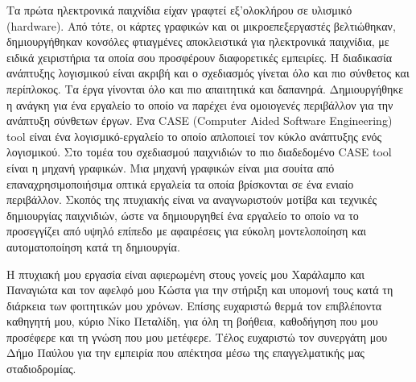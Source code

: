 	\begin{Abstract}
		Τα πρώτα ηλεκτρονικά παιχνίδια είχαν γραφτεί εξ'ολοκλήρου σε υλισμικό (hardware). Από τότε, οι κάρτες γραφικών και οι μικροεπεξεργαστές βελτιώθηκαν, δημιουργήθηκαν κονσόλες φτιαγμένες αποκλειστικά για ηλεκτρονικά παιχνίδια, με ειδικά χειριστήρια τα οποία σου προσφέρουν διαφορετικές εμπειρίες.
		Η διαδικασία ανάπτυξης λογισμικού είναι ακριβή και ο σχεδιασμός γίνεται όλο και πιο σύνθετος και περίπλοκος. Τα έργα γίνονται όλο και πιο απαιτητικά και δαπανηρά. Δημιουργήθηκε η ανάγκη για ένα εργαλείο το οποίο να παρέχει ένα ομοιογενές περιβάλλον για την ανάπτυξη σύνθετων έργων. 
		Ένα CASE (Computer Aided Software Engineering) tool είναι ένα λογισμικό-εργαλείο το οποίο απλοποιεί τον κύκλο ανάπτυξης ενός λογισμικού. 
		Στο τομέα του σχεδιασμού παιχνιδιών το πιο διαδεδομένο CASE tool είναι η μηχανή γραφικών. Μια μηχανή γραφικών είναι μια σουίτα από επαναχρησιμοποιήσιμα οπτικά εργαλεία τα οποία βρίσκονται σε ένα ενιαίο περιβάλλον.
		Σκοπός της πτυχιακής είναι να αναγνωριστούν μοτίβα και τεχνικές δημιουργίας παιχνιδιών, ώστε να δημιουργηθεί ένα εργαλείο το οποίο να το προσεγγίζει από υψηλό επίπεδο με αφαιρέσεις για εύκολη μοντελοποίηση και αυτοματοποίηση κατά τη δημιουργία.
	\end{Abstract}
	
	\begin{Acknowledgement}
			Η πτυχιακή μου εργασία είναι αφιερωμένη στους γονείς μου Χαράλαμπο και Παναγιώτα και τον αφελφό μου Κώστα για την στήριξη και υπομονή τους κατά τη διάρκεια των φοιτητικών μου χρόνων. Επίσης ευχαριστώ θερμά τον επιβλέποντα καθηγητή μου, κύριο Νίκο Πεταλίδη, για όλη τη βοήθεια, καθοδήγηση που μου προσέφερε και τη γνώση που μου μετέφερε. Τέλος ευχαριστώ τον συνεργάτη μου Δήμο Παύλου για την εμπειρία που απέκτησα μέσω της επαγγελματικής μας σταδιοδρομίας.
	\end{Acknowledgement}